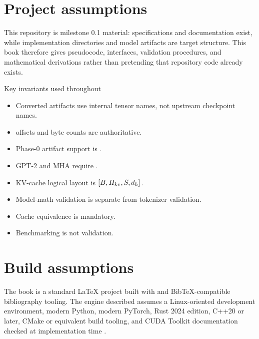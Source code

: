 \chapter*{Project assumptions}
This repository is milestone 0.1 material: specifications and documentation exist, while implementation directories and model artifacts are target structure. This book therefore gives pseudocode, interfaces, validation procedures, and mathematical derivations rather than pretending that repository code already exists.

\begin{contractbox}{Key invariants used throughout}
\begin{itemize}
\item Converted artifacts use internal tensor names, not upstream checkpoint names.
\item {} offsets and byte counts are authoritative.
\item Phase-0 artifact support is .
\item GPT-2 and MHA require .
\item KV-cache logical layout is \(\left[B,H_{kv},S,d_h\right]\).
\item Model-math validation is separate from tokenizer validation.
\item Cache equivalence is mandatory.
\item Benchmarking is not validation.
\end{itemize}
\end{contractbox}



\chapter*{Build assumptions}
The book is a standard LaTeX project built with  and BibTeX-compatible bibliography tooling. The engine described assumes a Linux-oriented development environment, modern Python, modern PyTorch, Rust 2024 edition, C++20 or later, CMake or equivalent build tooling, and CUDA Toolkit documentation checked at implementation time \citep{pytorchDocs,rust2024edition,cpp2020,cmakeDocs,cudaProgrammingGuide,cudaArchive,cuda13ReleaseNotes}.
